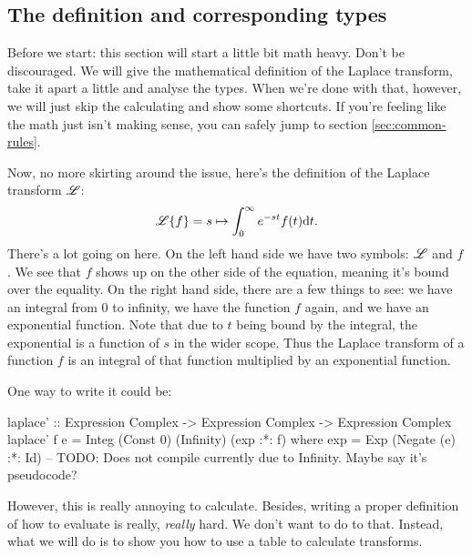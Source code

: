 \subsection{The definition and corresponding types}
Before we start: this section will start a little bit math heavy. Don't be
discouraged. We will give the mathematical definition of the Laplace transform,
take it apart a little and analyse the types. When we're done with that,
however, we will just skip the calculating and show some shortcuts. If you're
feeling like the math just isn't making sense, you can safely jump to section
\ref{sec:common-rules}. 

Now, no more skirting around the issue, here's the definition of the Laplace
transform $\mathscr{L}$: 
\begin{equation*}
 \mathscr{L} \{f\} = s \mapsto \int_0^\infty e^{-st}f(t) \dd t. 
\end{equation*}
There's a lot going on here. On the left hand side we have two symbols: $\mathscr{L}$
and $f$. We see that $f$ shows up on the other side of the equation, meaning
it's bound over the equality. On the right hand side, there are a few things to
see: we have an integral from $0$ to infinity, we have the function $f$ again,
and we have an exponential function. Note that due to $t$ being bound by the
integral, the exponential is a function of $s$ in the wider scope. 
Thus the Laplace transform of a function $f$ is an integral of that function
multiplied by an exponential function.

One way to write it could be: 
\begin{code}
laplace' :: Expression Complex -> Expression Complex -> Expression Complex
laplace' f e = Integ (Const 0) (Infinity) (exp :*: f) 
               where exp = Exp (Negate (e) :*: Id) 
-- TODO: Does not compile currently due to Infinity. Maybe say it's pseudocode? 
\end{code}



However, this is really annoying to calculate. Besides, writing a proper
definition of how to evaluate  is really, \emph{really} hard. We
don't want to do to that. Instead, what we will do is to show you how to use a
table to calculate transforms. 

